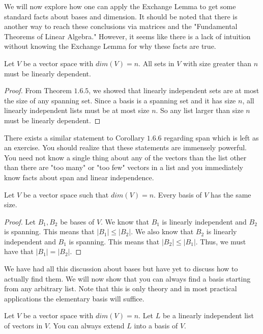 We will now explore how one can apply the Exchange Lemma to get some standard facts about bases and dimension. It should be noted that there is another way to reach these conclusions via matrices and the "Fundamental Theorems of Linear Algebra." However, it seems like there is a lack of intuition without knowing the Exchange Lemma for why these facts are true.
\begin{corollary}
    Let $V$ be a vector space with $dim(V)=n$. All sets in $V$ with size greater than $n$ must be linearly dependent.
\end{corollary}
\begin{proof}
    From Theorem $1.6.5$, we showed that linearly independent sets are at most the size of any spanning set. Since a basis is a spanning set and it has size $n$, all linearly independent lists must be at most size $n$. So any list larger than size $n$ must be linearly dependent.
\end{proof}
There exists a similar statement to Corollary $1.6.6$ regarding span which is left as an exercise. You should realize that these statements are immensely powerful. You need not know a single thing about any of the vectors than the list other than there are "too many" or "too few" vectors in a list and you immediately know facts about span and linear independence.
\begin{theorem}
    Let $V$ be a vector space such that $dim(V)=n$. Every basis of $V$ has the same size.
\end{theorem}
\begin{proof}
    Let $B_1, B_2$ be bases of $V$. We know that $B_1$ is linearly independent and $B_2$ is spanning. This means that $|B_1|\leq |B_2|$. We also know that $B_2$ is linearly independent and $B_1$ is spanning. This means that $|B_2|\leq |B_1|$. Thus, we must have that $|B_1|=|B_2|$.
\end{proof}
We have had all this discussion about bases but have yet to discuss how to actually find them. We will now show that you can always find a basis starting from any arbitrary list. Note that this is only theory and in most practical applications the elementary basis will suffice.
\begin{theorem}
    Let $V$ be a vector space with $dim(V)=n$. Let $L$ be a linearly independent list of vectors in $V$. You can always extend $L$ into a basis of $V$.
\end{theorem}
